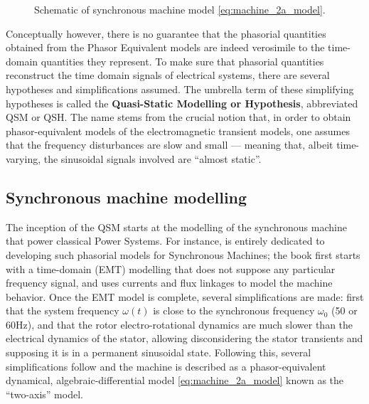 \begin{figure}
\centering
	\caption{Schematic of synchronous machine model \eqref{eq:machine_2a_model}.}
	\label{fig:machine_model}
\end{figure} %

	Conceptually however, there is no guarantee that the phasorial quantities obtained from the Phasor Equivalent models are indeed verosimile to the time-domain quantities they represent. To make sure that phasorial quantities reconstruct the time domain signals of electrical systems, there are several hypotheses and simplifications assumed. The umbrella term of these simplifying hypotheses is called the \textbf{Quasi-Static Modelling or Hypothesis}, abbreviated QSM or QSH. The name stems from the crucial notion that, in order to obtain phasor-equivalent models of the electromagnetic transient models, one assumes that the frequency disturbances are slow and small — meaning that, albeit time-varying, the sinusoidal signals involved are ``almost static''.

\subsection{Synchronous machine modelling}\label{subsec:synchmachine_modelling} %

	The inception of the QSM starts at the modelling of the synchronous machine that power classical Power Systems. For instance, \cite{Ramos2000} is entirely dedicated to developing such phasorial models for Synchronous Machines; the book first starts with a time-domain (EMT) modelling that does not suppose any particular frequency signal, and uses currents and flux linkages to model the machine behavior. Once the EMT model is complete, several simplifications are made: first that the system frequency $\omega(t)$ is close to the synchronous frequency $\omega_0$ (50 or 60Hz), and that the rotor electro-rotational dynamics are much slower than the electrical dynamics of the stator, allowing disconsidering the stator transients and supposing it is in a permanent sinusoidal state. Following this, several simplifications follow and the machine is described as a phasor-equivalent dynamical, algebraic-differential model \eqref{eq:machine_2a_model} known as the ``two-axis'' model.

